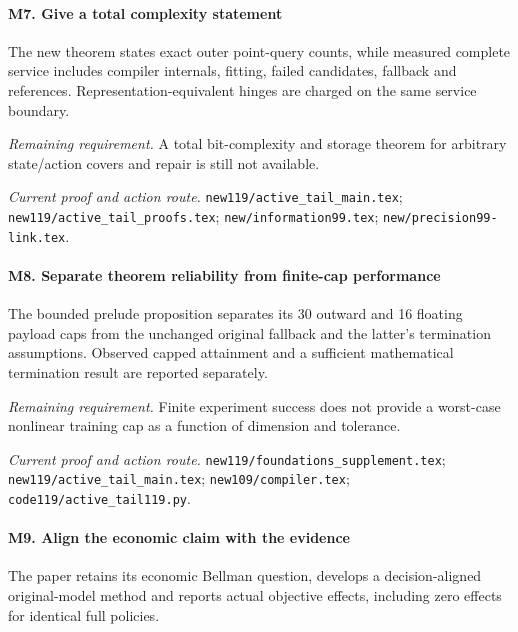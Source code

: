 \paragraph{M7. Give a total complexity statement}

The new theorem states exact outer point-query counts, while measured complete service includes compiler internals, fitting, failed candidates, fallback and references. Representation-equivalent hinges are charged on the same service boundary.

\par\emph{Remaining requirement.} A total bit-complexity and storage theorem for arbitrary state/\allowbreak{}action covers and repair is still not available.

\par\emph{Current proof and action route.} \nolinkurl{new119/active_tail_main.tex}; \nolinkurl{new119/active_tail_proofs.tex}; \nolinkurl{new/information99.tex}; \nolinkurl{new/precision99-link.tex}.

\paragraph{M8. Separate theorem reliability from finite-cap performance}

The bounded prelude proposition separates its 30 outward and 16 floating payload caps from the unchanged original fallback and the latter's termination assumptions. Observed capped attainment and a sufficient mathematical termination result are reported separately.

\par\emph{Remaining requirement.} Finite experiment success does not provide a worst-case nonlinear training cap as a function of dimension and tolerance.

\par\emph{Current proof and action route.} \nolinkurl{new119/foundations_supplement.tex}; \nolinkurl{new119/active_tail_main.tex}; \nolinkurl{new109/compiler.tex}; \nolinkurl{code119/active_tail119.py}.

\paragraph{M9. Align the economic claim with the evidence}

The paper retains its economic Bellman question, develops a decision-aligned original-model method and reports actual objective effects, including zero effects for identical full policies.

